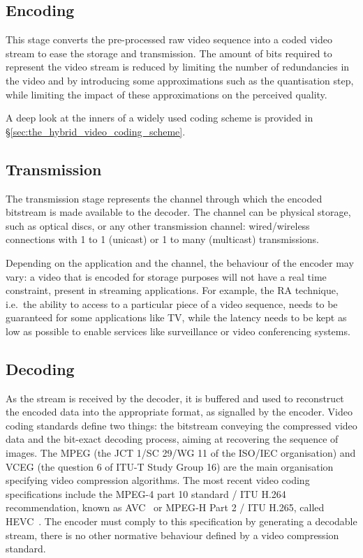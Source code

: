 \documentclass[11pt,a4paper,openright,twoside]{book}
\numberwithin{equation}{section} %
\numberwithin{figure}{section} %
\numberwithin{table}{section} %
\begin{document}
\subsection{Encoding}
\label{sub:encoding}

This stage converts the pre-processed raw video sequence into a coded video
stream to ease the storage and transmission.
The amount of bits required to represent the video stream is reduced by
limiting the number of redundancies in the video and by introducing some
approximations such as the quantisation step, while limiting the impact of
these approximations on the perceived quality.

A deep look at the inners of a widely used coding scheme is provided
in \S\ref{sec:the_hybrid_video_coding_scheme}.

\subsection{Transmission}
\label{sub:transmission}

The transmission stage represents the channel through which the encoded
bitstream is made available to the decoder.
The channel can be physical storage, such as optical discs, or any other
transmission channel: wired/wireless connections with 1 to 1 (unicast) or 1 to
many (multicast) transmissions.

Depending on the application and the channel, the behaviour of the encoder may
vary:
a video that is encoded for storage purposes will not have a real time
constraint, present in streaming applications.
For example, the \ac{RA} technique, i.e.\ the ability to access to a
particular piece of a video sequence, needs to be guaranteed for some
applications like TV, while the latency needs to be kept as low as possible to
enable services like surveillance or video conferencing systems.

\subsection{Decoding}
\label{sub:decoding}

As the stream is received by the decoder, it is buffered and used to
reconstruct the encoded data into the appropriate format, as signalled
by the encoder.
Video coding standards define two things: the bitstream conveying the
compressed video data and the bit-exact decoding process, aiming at recovering
the sequence of images.
The \acs{MPEG} (the \acs{JCT} 1/\acs{SC} 29/\acs{WG} 11 of the
\acs{ISO}/\acs{IEC} organisation) and \acs{VCEG} (the question 6 of
\acs{ITU-T} Study Group 16) are the main organisation specifying video
compression algorithms.
The most recent video coding specifications include the \acs{MPEG}-4 part 10
standard / \acs{ITU} H.264 recommendation, known as \ac{AVC}~\cite{itu-03-avc}
or \acs{MPEG}-H Part 2 / \acs{ITU} H.265, called
\acf{HEVC}~\cite{itu-13-hevc}.
The encoder must comply to this specification by generating a decodable
stream, there is no other normative behaviour defined by a video compression
standard.
\end{document}

